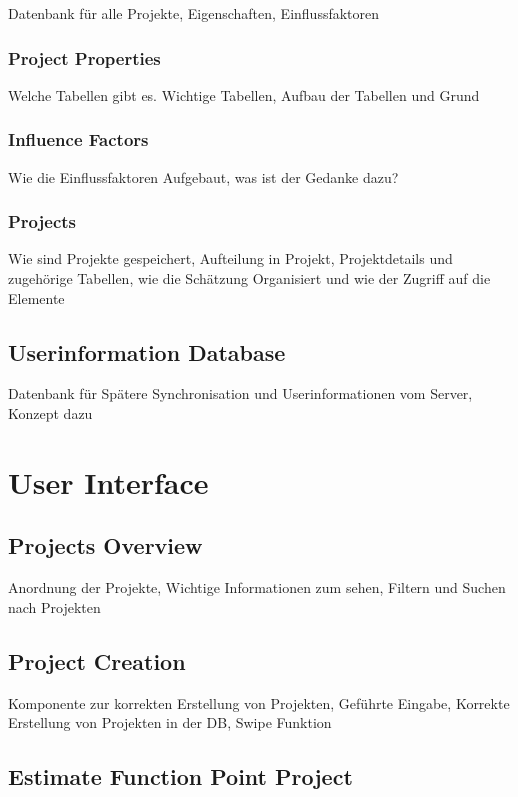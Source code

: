 Datenbank für alle Projekte, Eigenschaften, Einflussfaktoren

\subsubsection{Project Properties}

Welche Tabellen gibt es. Wichtige Tabellen, Aufbau der Tabellen und Grund

\subsubsection{Influence Factors}

Wie die Einflussfaktoren Aufgebaut, was ist der Gedanke dazu?

\subsubsection{Projects}

Wie sind Projekte gespeichert, Aufteilung in Projekt, Projektdetails und zugehörige Tabellen, wie die Schätzung Organisiert und wie der Zugriff auf die Elemente

\subsection{Userinformation Database}

Datenbank für Spätere Synchronisation und Userinformationen vom Server, Konzept dazu

\section{User Interface}

\subsection{Projects Overview}

Anordnung der Projekte, Wichtige Informationen zum sehen, Filtern und Suchen nach Projekten

\subsection{Project Creation}

Komponente zur korrekten Erstellung von Projekten, Geführte Eingabe, Korrekte Erstellung von Projekten in der DB, Swipe Funktion

\subsection{Estimate Function Point Project}

